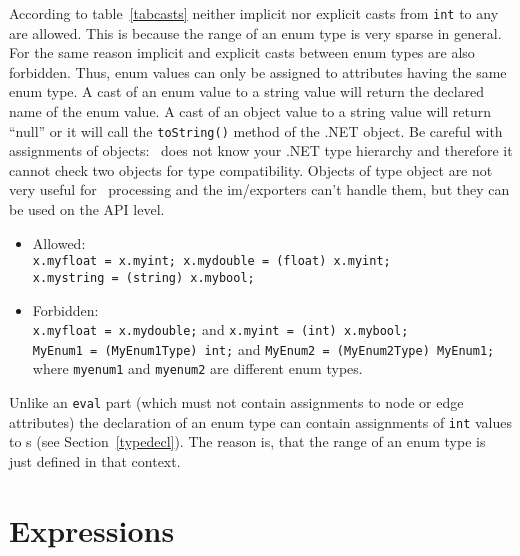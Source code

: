 According to table~\ref{tabcasts} neither implicit nor explicit casts from {\tt int} to any  are allowed.
This is because the range of an enum type is very sparse in general.
For the same reason implicit and explicit casts between enum types are also forbidden.
Thus, enum values can only be assigned to attributes having the same enum type.
A cast of an enum value to a string value will return the declared name of the enum value.
A cast of an object value to a string value will return ``null'' or it will call the \texttt{toString()} method of the .NET object.
Be careful with assignments of objects: \GrG\ does not know your .NET type hierarchy and therefore it cannot check two objects for type compatibility.
Objects of type object are not very useful for \GrG\ processing and the im/exporters can't handle them,
but they can be used on the API level.

\begin{example}
  \begin{itemize}
    \item Allowed:\\
	  \texttt{x.myfloat = x.myint; x.mydouble = (float) x.myint;\\ x.mystring = (string) x.mybool;}
    \item Forbidden:\\
      \texttt{x.myfloat = x.mydouble;} and \texttt{x.myint = (int) x.mybool;}\\
      \texttt{MyEnum1 = (MyEnum1Type) int;} and \texttt{MyEnum2 = (MyEnum2Type) MyEnum1;}
  where {\tt myenum1} and {\tt myenum2} are different enum types.

  \end{itemize}
\end{example}

\begin{note}
	Unlike an {\tt eval} part (which must not contain assignments to node or edge attributes) the declaration of an enum type can contain assignments of {\tt int} values to s (see Section~\ref{typedecl}).
	The reason is, that the range of an enum type is just defined in that context.
\end{note}


\section{Expressions}\label{sub:expr}


